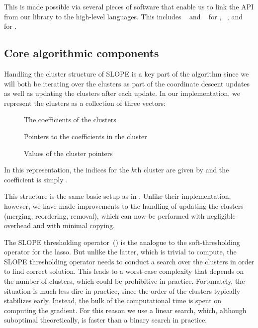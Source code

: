 \documentclass[article]{jss}
\let\Cref\crtCref
\begin{document}
This is made possible via several pieces of software that enable us to link the
API from our  library to the high-level languages. This includes
~\citep{eddelbuettel2011} and ~\citep{bates2013} for
, ~\citep{jakob2025}, and ~\citep{janssens2020} for
.

\subsection{Core algorithmic components}

Handling the cluster structure of SLOPE is a key part of the algorithm since we
will both be iterating over the clusters as part of the coordinate descent
updates as well as updating the clusters after each update. In our
implementation, we represent the clusters as a collection of three vectors:

\begin{description}
  \item[] The coefficients of the clusters
  \item[] Pointers to the coefficients in the cluster
  \item[] Values of the cluster pointers
\end{description}

In this representation, the indices for the \(k\)th cluster are given by  and the coefficient is simply .

This structure is the same basic setup as in \citet{larsson2023}. Unlike
their implementation, however, we have made improvements to the
handling of updating the clusters (merging,
reordering, removal), which can now be performed with negligible
overhead and with minimal copying.

The SLOPE thresholding operator~(\Cref{fig:slope-thresholding}) is the analogue
to the soft-thresholding operator for the lasso. But unlike the latter, which
is trivial to compute, the SLOPE thresholding operator needs to conduct a
search over the clusters in order to find correct solution. This leads to a
worst-case complexity that depends on the number of clusters, which could be prohibitive in
practice. Fortunately, the situation is much less dire in practice, since the
order of the clusters typically stabilizes early. Instead, the bulk of the
computational time is spent on computing the gradient. For this reason we use a
linear search, which, although suboptimal theoretically, is faster than a
binary search in practice.
\end{document}
